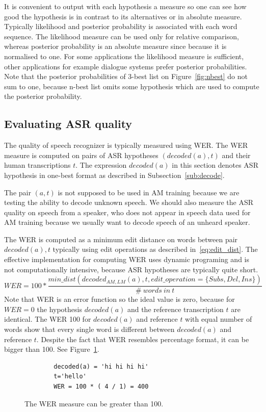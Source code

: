{It is convenient to output with each hypothesis a measure so one can see how good the hypothesis is in contrast to its alternatives or in absolute measure. 
Typically likelihood and posterior probability is associated with each word sequence.
The likelihood measure can be used only for relative comparison, whereas posterior probability is an absolute measure since because it is normalised to one.
For some applications the likelihood measure is sufficient, other applications for example dialogue systems prefer posterior probabilities.
Note that the posterior probabilities of 3-best list on Figure~\ref{fig:nbest} do not sum to one, because n-best list omits some hypothesis which are used to compute the posterior probability.

\subsection[Evaluating \acs{ASR} quality]{Evaluating \acl{ASR} quality}
\label{sub:eval}
The quality of speech recognizer is typically measured using \acl{WER}.
The \ac{WER} measure is computed on pairs of \ac{ASR} hypotheses $(decoded(a),t)$ and their human transcriptions $t$.
The expression $decoded(a)$  in this section denotes \ac{ASR} hypothesis in one-best format as described in Subsection~\ref{sub:decode}.

The pair $(a,t)$ is not supposed to be used in \ac{AM} training because we are testing the ability to decode unknown speech.
We should also measure the \ac{ASR} quality on speech from a speaker, who does not appear in speech data used for \ac{AM} training because we usually want to decode speech of an unheard speaker.

The \ac{WER} is computed as a minimum edit distance on words between 
pair $decoded(a), t$ typically using edit operations  as described in~\ref{eq:edit_dist}.
The effective implementation for computing WER uses dynamic programing and is not computationally intensive,
because \ac{ASR} hypotheses are typically quite short.
\begin{equation} \label{eq:edit_dist}
    WER = 100* \frac{min\_dist(decoded_{AM, LM}(a), t, edit\_operation=\{Subs, Del, Ins\})}{\#\ words\ in\ t}
\end{equation}
Note that \ac{WER} is an error function so the ideal value is zero, because for $WER=0$ the hypothesis $decoded(a)$ and 
the reference transcription $t$ are identical. The \ac{WER} 100 for $decoded(a)$ and reference $t$ 
with equal number of words show that every single word is different between $decoded(a)$ and reference $t$.
Despite the fact that \ac{WER} resembles percentage format, it can be bigger than 100. See Figure~\ref{fig:wer400}.
\begin{figure}[!htp]
    \begin{center}
    \begin{verbatim}
        decoded(a) = 'hi hi hi hi'
        t='hello'
        WER = 100 * ( 4 / 1) = 400
    \end{verbatim}
    \caption{The \acs{WER} measure can be greater than 100.}
    \label{fig:wer400} 
    \end{center}
\end{figure}

}
